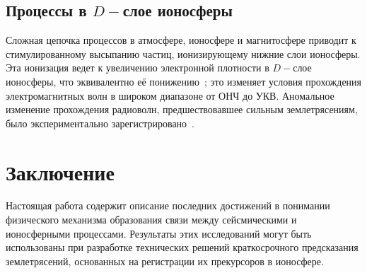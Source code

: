 \documentclass[12pt, oneside, a4paper]{article}
\begin{document}
\subsection{Процессы в $D-$слое ионосферы}
Сложная цепочка процессов в атмосфере, ионосфере и магнитосфере приводит к стимулированному высыпанию частиц, ионизирующему нижние слои ионосферы. Эта ионизация ведет к увеличению электронной плотности в $D-$слое ионосферы, что эквивалентно её понижению~\cite{Kim:2002}; это изменяет условия прохождения электромагнитных волн в широком диапазоне от ОНЧ до УКВ. Аномальное изменение прохождения радиоволн, предшествовавшее сильным землетрясениям, было экспериментально зарегистрировано~\cite{Gufeld:1992}.  
\section{Заключение}
Настоящая работа содержит описание последних достижений в понимании физического механизма образования связи между сейсмическими и ионосферными процессами. Результаты этих исследований могут быть использованы при разработке технических решений краткосрочного предсказания землетрясений, основанных на регистрации их прекурсоров в ионосфере. 
\newpage


\end{document}
